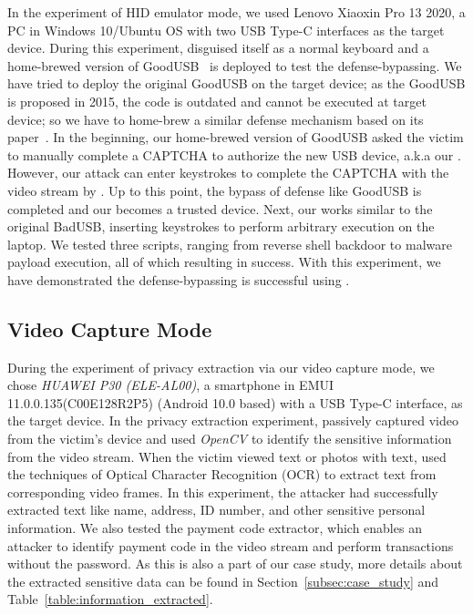 In the experiment of HID emulator mode, we used {Lenovo Xiaoxin Pro 13
2020}, a PC in Windows 10/Ubuntu OS with two USB Type-C interfaces as the
target device.  During this experiment, \tool disguised itself as a normal
keyboard and a home-brewed version of GoodUSB~\cite{tian2015defending} is
deployed to test the defense-bypassing. We have tried to deploy the original
GoodUSB on the target device; as the GoodUSB is proposed in 2015, the code is
outdated and cannot be executed at target device; so we have to home-brew a similar
defense mechanism based on its paper~\cite{tian2015defending}.  In the
beginning, our home-brewed version of GoodUSB asked the victim to manually complete
a CAPTCHA to authorize the new USB device, a.k.a our \tool.
However, our attack can enter keystrokes to complete the
CAPTCHA with the video stream by \tool. Up
to this point, the bypass of defense like GoodUSB is completed and our \tool
becomes a trusted device. Next, our
\tool works similar to the original BadUSB, inserting keystrokes to perform
arbitrary execution on the laptop. We tested three scripts, ranging from
reverse shell backdoor to malware payload execution, all of which resulting in
success. With this experiment, we have demonstrated the defense-bypassing is successful
using \tool.


\subsection{Video Capture Mode}

During the experiment of privacy extraction via our video capture mode, we chose \textit{HUAWEI P30 (ELE-AL00)}, a
smartphone in EMUI 11.0.0.135(C00E128R2P5) (Android 10.0 based) with a USB Type-C interface, as the
target device.  In the privacy extraction experiment, \tool passively captured video
from the victim's device and used \textit{OpenCV} to identify the sensitive
information from the video stream.  When the victim viewed text or photos with
text, \tool used the techniques of Optical Character Recognition (OCR)  to
extract text from corresponding video frames. In this experiment, the attacker had
successfully extracted text like name, address, ID number, and other sensitive
personal information. We also tested the payment code extractor, which enables
an attacker to identify payment code in the video stream and perform transactions
without the password. As this is also a part of our case study, more details about
the extracted sensitive data can be found in Section~\ref{subsec:case_study} and
Table~\ref{table:information_extracted}.

